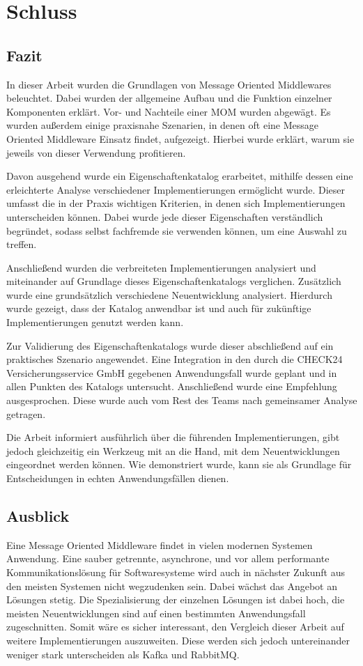 \chapter{Schluss}
\label{part:end}
\section{Fazit}
In dieser Arbeit wurden die Grundlagen von Message Oriented Middlewares
beleuchtet. Dabei wurden der allgemeine Aufbau und die Funktion
einzelner Komponenten erklärt. Vor- und Nachteile einer MOM wurden
abgewägt.
Es wurden außerdem einige praxisnahe Szenarien, in denen oft eine Message
Oriented Middleware Einsatz findet, aufgezeigt. Hierbei wurde erklärt,
warum sie jeweils von dieser Verwendung profitieren.

Davon ausgehend wurde ein Eigenschaftenkatalog erarbeitet,
mithilfe dessen eine erleichterte Analyse verschiedener Implementierungen
ermöglicht wurde. Dieser umfasst die in der Praxis wichtigen Kriterien,
in denen sich Implementierungen unterscheiden können. Dabei wurde jede
dieser Eigenschaften verständlich begründet, sodass selbst fachfremde
sie verwenden können, um eine Auswahl zu treffen.

Anschließend wurden die verbreiteten Implementierungen analysiert und
miteinander auf Grundlage dieses Eigenschaftenkatalogs verglichen.
Zusätzlich wurde eine grundsätzlich verschiedene Neuentwicklung analysiert.
Hierdurch wurde gezeigt, dass der Katalog anwendbar ist
und auch für zukünftige Implementierungen genutzt werden kann.

Zur Validierung des Eigenschaftenkatalogs wurde dieser abschließend auf ein
praktisches Szenario angewendet. Eine Integration in den durch die CHECK24
Versicherungsservice GmbH gegebenen Anwendungsfall wurde geplant und in
allen Punkten des Katalogs untersucht. Anschließend wurde eine Empfehlung
ausgesprochen. Diese wurde auch vom Rest des Teams nach gemeinsamer Analyse
getragen.

Die Arbeit informiert ausführlich über die führenden Implementierungen,
gibt jedoch gleichzeitig ein Werkzeug mit an die Hand, mit dem Neuentwicklungen
eingeordnet werden können. Wie demonstriert wurde, kann sie als Grundlage
für Entscheidungen in echten Anwendungsfällen dienen.

\section{Ausblick}
Eine Message Oriented Middleware findet in vielen modernen Systemen Anwendung.
Eine sauber getrennte, asynchrone, und vor allem performante
Kommunikationslösung für Softwaresysteme wird auch in nächster Zukunft aus den
meisten Systemen nicht wegzudenken sein.
Dabei wächst das Angebot an Lösungen stetig. Die Spezialisierung der einzelnen
Lösungen ist dabei hoch, die meisten Neuentwicklungen sind auf einen bestimmten
Anwendungsfall zugeschnitten.
Somit wäre es sicher interessant, den Vergleich dieser Arbeit auf weitere
Implementierungen auszuweiten. Diese werden sich jedoch untereinander weniger
stark unterscheiden als Kafka und RabbitMQ.

